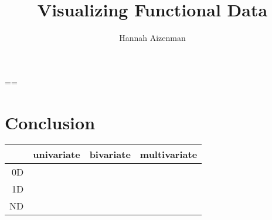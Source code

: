 ==\documentclass[letterpaper,onecolumn,titlepage]{Ythesis}
\title{Visualizing Functional Data}
\author{Hannah Aizenman}
\begin{document}
\makefrontmatter




\section{Conclusion}
\label{sec:conclusion}

\begin{tabular}{|r|r|r|r|}
  \hline
              & univariate & bivariate & multivariate\\
  \hline
   0D         &            &           &             \\
  \hline
   1D         &            &           &             \\
   \hline
   ND         &            &           &             \\
\end{tabular}

\pagebreak
\printbibliography
\end{document}
